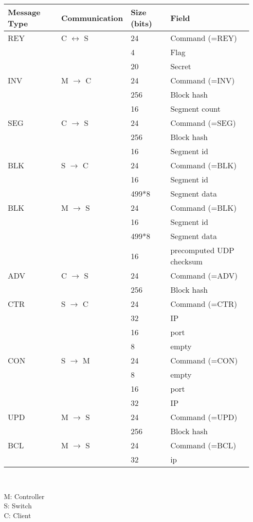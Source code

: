 \begin{center}
\begin{tabular}{|l|l|l|l|}
	\hline
	\textbf{Message Type} & \textbf{Communication} & \textbf{Size (bits)} & \textbf{Field} \\
	\hline
	REY	& C $\leftrightarrow$ S 	& 24		& Command (=REY) \\
		& 		& 4		& Flag \\
		& 		& 20		& Secret \\
	\hline
	INV	& M $\to$ C 	& 24		& Command (=INV) \\
		& 		& 256	& Block hash \\
		& 		& 16	& Segment count \\
		\hline
	SEG	& C $\to$ S 	& 24	& Command (=SEG) \\
		& 				& 256	& Block hash \\
		& 				& 16	& Segment id \\
		\hline
	BLK	& S $\to$ C 	& 24	& Command (=BLK)\\
		& 				& 16	& Segment id \\
		& 				& 499*8	& Segment data \\
		\hline
	BLK	& M $\to$ S 	& 24	& Command (=BLK)\\
		& 				& 16	& Segment id \\
		& 				& 499*8	& Segment data \\
		&				& 16	& precomputed UDP checksum \\
\hline
	ADV	& C $\to$ S 	& 24	& Command (=ADV)\\
		& 				& 256	& Block hash \\
\hline
	CTR	& S $\to$ C 	& 24	& Command (=CTR)\\
		& 				& 32	& IP \\
		& 				& 16	& port \\
		&				& 8		& empty \\
\hline
	CON	& S $\to$ M 	& 24	& Command (=CON) \\
		& 				& 8		& empty \\
		& 				& 16	& port \\
		& 				& 32	& IP \\
\hline
	UPD	& M $\to$ S 	& 24	& Command (=UPD) \\
		& 				& 256	& Block hash \\
\hline
	BCL	& M $\to$ S 	& 24	& Command (=BCL) \\
		& 				& 32	& ip \\
	\hline
\end{tabular}\\
\end{center}
M: Controller\\
S: Switch\\
C: Client\\




